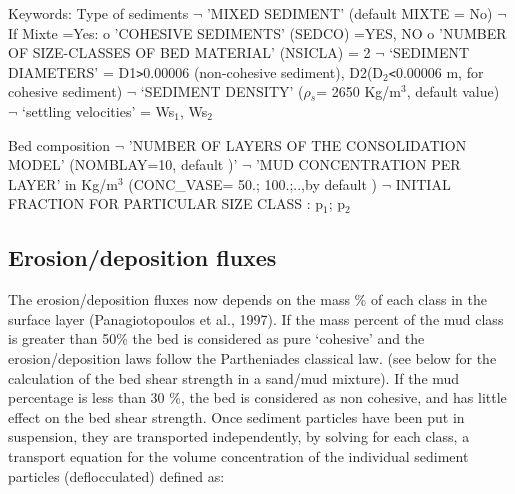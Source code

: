 Keywords:\newline
Type of sediments\newline
$\neg$\hspace{5mm} 'MIXED SEDIMENT' (default MIXTE = No)\newline
$\neg$\hspace{5mm} If Mixte =Yes: \newline
o\hspace{5mm} 'COHESIVE SEDIMENTS' (SEDCO) =YES, NO\hspace{5mm} \newline
o\hspace{5mm} 'NUMBER OF SIZE-CLASSES OF BED MATERIAL' (NSICLA) = 2\newline
$\neg$\hspace{5mm} `SEDIMENT DIAMETERS' = D1\texttt{>}0.00006 (non-cohesive
sediment), D2(D$_{2}$\texttt{<}0.00006 m, for cohesive sediment)\newline
$\neg$\hspace{5mm} `SEDIMENT DENSITY' ($\rho$$_{s}$= 2650 Kg/m$^{3}$,
default value)\newline
$\neg$\hspace{5mm} `settling velocities' = Ws$_{1}$, Ws$_{2}$

Bed composition\newline
$\neg$\hspace{5mm} 'NUMBER OF LAYERS OF THE CONSOLIDATION MODEL'
(NOMBLAY=10, default )'\newline
$\neg$\hspace{5mm} 'MUD CONCENTRATION PER LAYER' in Kg/m$^{3}$ (CONC\_VASE=
50.; 100.;..,by default )\newline
$\neg$\hspace{5mm} INITIAL FRACTION FOR PARTICULAR SIZE CLASS : p$_{1}$; p$%
_{2}$

\subsection{Erosion/deposition fluxes}

The erosion/deposition fluxes now depends on the mass \% of each class in
the surface layer (Panagiotopoulos et al., 1997). If the mass percent of the
mud class is greater than 50\% the bed is considered as pure `cohesive' and
the erosion/deposition laws follow the Partheniades classical law. (see
below for the calculation of the bed shear strength in a sand/mud mixture).%
\newline
If the mud percentage is less than 30 \%, the bed is considered as non
cohesive, and has little effect on the bed shear strength.\newline
Once sediment particles have been put in suspension, they are transported
independently, by solving for each class, a transport equation for the
volume concentration of the individual sediment particles (deflocculated)
defined as:

